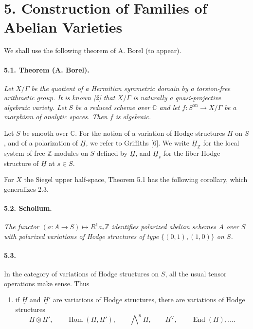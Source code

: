 \documentclass[10pt,leqno]{article}
\newcommand{\C}{\mathbb{C}}
\newcommand{\Z}{\mathbb{Z}}
\newcommand{\End}{\operatorname{End}}
\newcommand{\Hom}{\operatorname{Hom}}
\begin{document}
\section*{5. Construction of Families of Abelian Varieties}

We shall use the following theorem of A. Borel (to appear).

\paragraph{5.1. Theorem (A. Borel).} \emph{Let $X/\Gamma$ be the quotient of a Hermitian symmetric domain by a torsion-free arithmetic group. It is known [2] that $X/\Gamma$ is naturally a quasi-projective algebraic variety. Let $S$ be a reduced scheme over $\C$ and let $f:S^{\mathrm{an}}\to X/\Gamma$ be a morphism of analytic spaces. Then $f$ is algebraic.}

Let $S$ be smooth over $\C$. For the notion of a variation of Hodge structures $\underline H$ on $S$, and of a polarization of $\underline H$, we refer to Griffiths [6]. We write $\underline H_\Z$ for the local system of free $\Z$-modules on $S$ defined by $\underline H$, and $\underline H_s$ for the fiber Hodge structure of $\underline H$ at $s\in S$.

For $X$ the Siegel upper half-space, Theorem 5.1 has the following corollary, which generalizes 2.3.

\paragraph{5.2. Scholium.} \emph{The functor $(a:A\to S)\mapsto R^1a_*\Z$ identifies polarized abelian schemes $A$ over $S$ with polarized variations of Hodge structures of type $\{(0,1),(1,0)\}$ on $S$.}

\paragraph{5.3.} In the category of variations of Hodge structures on $S$, all the usual tensor operations make sense. Thus
\begin{enumerate}[label=\alph*)]
\item if $\underline H$ and $\underline H'$ are variations of Hodge structures, there are variations of Hodge structures
\[
\underline H\otimes\underline H',\qquad
\underline{\Hom}(\underline H,\underline H'),\qquad
\bigwedge\nolimits^n\underline H,\qquad
\underline H^\vee,\qquad
\underline{\End}(\underline H),\ldots.
\]
\end{enumerate}
\end{document}

